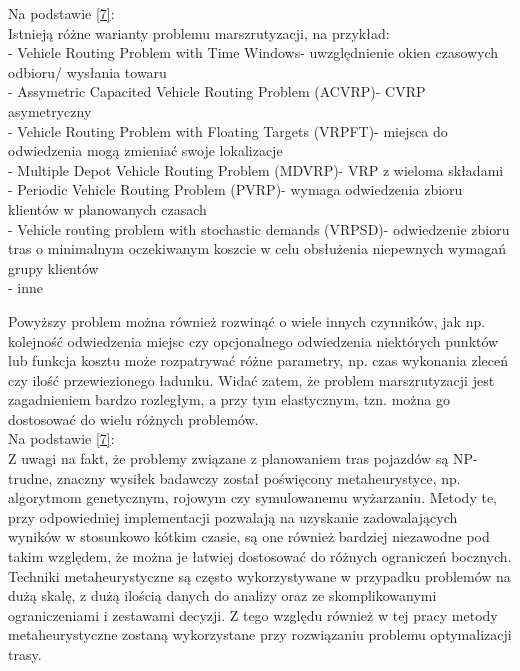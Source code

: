 \documentclass[a4paper, twoside, 12pt, justified]{article}
\begin{document}
	
	Na podstawie \hyperlink{vrp_variants}{[7]}:\\
	Istnieją różne warianty problemu marszrutyzacji, na przykład:\\ 
	- Vehicle Routing Problem with Time Windows- uwzględnienie okien czasowych odbioru/ wysłania towaru\\
	- Assymetric Capacited Vehicle Routing Problem (ACVRP)- CVRP asymetryczny\\
	- Vehicle Routing Problem with Floating Targets (VRPFT)- miejsca do odwiedzenia mogą zmieniać swoje lokalizacje\\
	- Multiple Depot Vehicle Routing Problem (MDVRP)- VRP z wieloma składami\\
	- Periodic Vehicle Routing Problem (PVRP)- wymaga odwiedzenia zbioru klientów w planowanych czasach\\
	- Vehicle routing problem with stochastic demands (VRPSD)- odwiedzenie zbioru tras o minimalnym oczekiwanym koszcie w celu obsłużenia niepewnych wymagań grupy klientów\\
	- inne
	
	\vspace{5mm} %
	
	Powyższy problem można również rozwinąć o wiele innych czynników, jak np. kolejność odwiedzenia miejsc czy opcjonalnego odwiedzenia niektórych punktów lub funkcja kosztu może rozpatrywać różne parametry, np. czas wykonania zleceń czy ilość przewiezionego ładunku. Widać zatem, że problem marszrutyzacji jest zagadnieniem bardzo rozległym, a przy tym elastycznym, tzn. można go dostosować do wielu różnych problemów.\\
	
	
	Na podstawie \hyperlink{vrp_solving}{[7]}:\\
	Z uwagi na fakt, że problemy związane z planowaniem tras pojazdów są NP-trudne, znaczny wysiłek badawczy został poświęcony metaheurystyce, np. algorytmom genetycznym, rojowym czy symulowanemu wyżarzaniu. Metody te, przy odpowiedniej implementacji pozwalają na uzyskanie zadowalających wyników w stosunkowo kótkim czasie, są one również bardziej niezawodne pod takim względem, że można je łatwiej dostosować do różnych ograniczeń bocznych. Techniki metaheurystyczne są często wykorzystywane w przypadku problemów na dużą skalę, z dużą ilością danych do analizy oraz ze skomplikowanymi ograniczeniami i zestawami decyzji. Z tego względu również w tej pracy metody metaheurystyczne zostaną wykorzystane przy rozwiązaniu problemu optymalizacji trasy.\\
	
\end{document}
